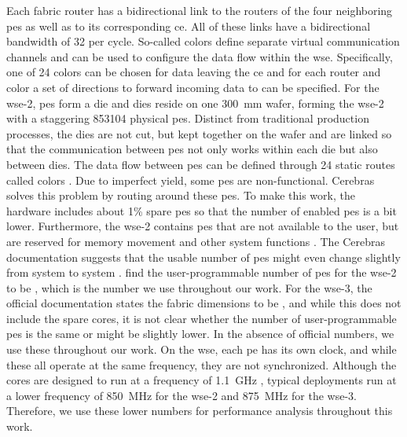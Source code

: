 Each fabric router has a bidirectional link to the routers of the four neighboring \acp{pe} as well as to its corresponding \ac{ce}. All of these links have a bidirectional bandwidth of \qty{32}{\bit} per cycle. So-called colors define separate virtual communication channels and can be used to configure the data flow within the \ac{wse}. Specifically, one of 24 colors can be chosen for data leaving the \ac{ce} and for each router and color a set of directions to forward incoming data to can be specified. For the \ac{wse}-2,  \acp{pe} form a die and  dies reside on one \qty{300}{\mm} wafer, forming the \ac{wse}-2 with a staggering \num{853104} physical \acp{pe}. Distinct from traditional production processes, the dies are not cut, but kept together on the wafer and are linked so that the communication between \acp{pe} not only works within each die but also between dies.
The data flow between \acp{pe} can be defined through 24 static routes called colors \cite{lie2023cerebras}.
Due to imperfect yield, some \acp{pe} are non-functional.
Cerebras solves this problem by routing around these \acp{pe}. 
To make this work, the hardware includes about 1\% spare \acp{pe} so that the number of enabled \acp{pe} is a bit lower. Furthermore, the \ac{wse}-2 contains \acp{pe} that are not available to the user, but are reserved for memory movement and other system functions \cite{tramm2024efficient}.
The Cerebras documentation suggests that the usable number of \acp{pe} might even change slightly from system to system \cite{cerebras_gemv_tutorial}. \citeauthor{tramm2024efficient} \cite{tramm2024efficient} find the user-programmable number of \acp{pe} for the \ac{wse}-2 to be , which is the number we use throughout our work. For the \ac{wse}-3, the official documentation states the fabric dimensions to be , and while this does not include the spare cores, it is not clear whether the number of user-programmable \acp{pe} is the same or might be slightly lower. In the absence of official numbers, we use these throughout our work. On the \ac{wse}, each \ac{pe} has its own clock, and while these all operate at the same frequency, they are not synchronized. Although the cores are designed to run at a frequency of \qty{1.1}{\giga\hertz} \cite{lie2023cerebras}, typical deployments run at a lower frequency of \qty{850}{\mega\hertz} for the \ac{wse}-2 \cite{tramm2024efficient} and \qty{875}{\mega\hertz} for the \ac{wse}-3. Therefore, we use these lower numbers for performance analysis throughout this work.

